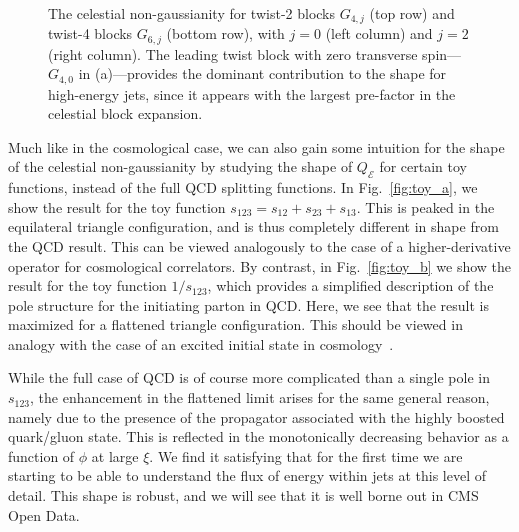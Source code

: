 \documentclass[letterpaper,11pt]{article}
\def\Fig#1{Fig.~{\ref{#1}}}
\DeclareRobustCommand{\Fig}[1]{Fig.~\ref{#1}}
\def\cE{\mathcal{E}}
\def\cE{\mathcal{E}}
\begin{document}
\begin{figure}
\begin{center}
\qquad 
{}\\
\qquad 
{}
\end{center}
\caption{
%
The celestial non-gaussianity for twist-2 blocks $G_{4, j}$ (top row) and twist-4 blocks $G_{6, j}$ (bottom row), with $j = 0$ (left column) and $j = 2$ (right column).  The leading twist block with zero transverse spin---$G_{4, 0}$ in (a)---provides the dominant contribution to the shape for high-energy jets, since it appears with the largest pre-factor in the celestial block expansion.}
\label{fig:twist2_blocks}
\end{figure}


Much like in the cosmological case, we can also gain some intuition for the shape of the celestial non-gaussianity by studying the shape of $Q_\cE$ for certain toy functions, instead of the full QCD splitting functions.
%
In \Fig{fig:toy_a}, we show the result for the toy function $s_{123} = s_{12} + s_{23} + s_{13}$.
%
This is peaked in the equilateral triangle configuration, and is thus completely different in shape from the QCD result.
%
This can be viewed analogously to the case of a higher-derivative operator for cosmological correlators.
%
By contrast, in \Fig{fig:toy_b} we show the result for the toy function $1/s_{123}$, which provides a simplified description of the pole structure for the initiating parton in QCD.
%
Here, we see that the result is maximized for a flattened triangle configuration.
%
This should be viewed in analogy with the case of an excited initial state in cosmology~\cite{Green:2020whw,Green:2022fwg}. 


While the full case of QCD is of course more complicated than a single pole in $s_{123}$, the enhancement in the flattened limit arises for the same general reason, namely due to the presence of the propagator associated with the highly boosted quark/gluon state.
%
This is reflected in the monotonically decreasing behavior as a function of $\phi$ at large $\xi$.
%
We find it satisfying that for the first time we are starting to be able to understand the flux of energy within jets at this level of detail.
%
This shape is robust, and we will see that it is well borne out in CMS Open Data.
\end{document}
